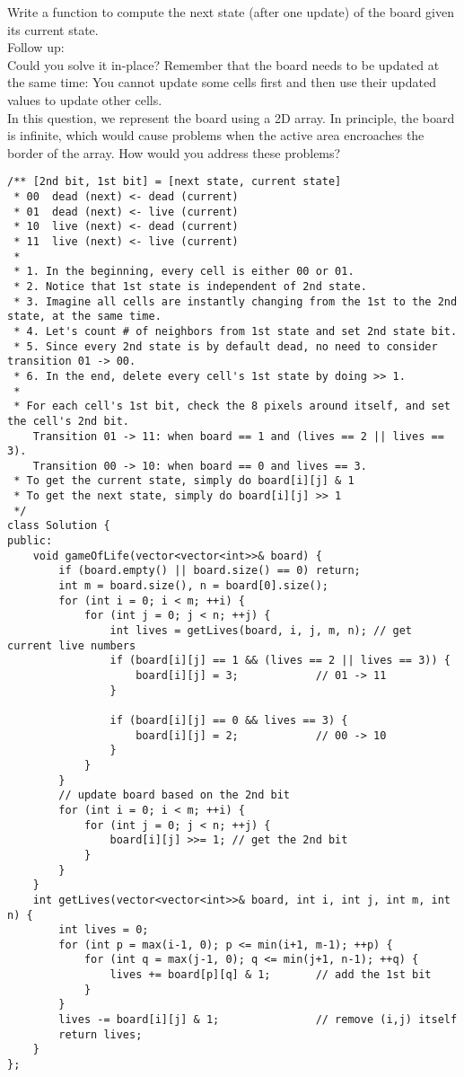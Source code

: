 Write a function to compute the next state (after one update) of the board given its current state.\\

Follow up:\\
    Could you solve it in-place? Remember that the board needs to be updated at the same time: You cannot update some cells first and then use their updated values to update other cells.\\
    In this question, we represent the board using a 2D array. In principle, the board is infinite, which would cause problems when the active area encroaches the border of the array. How would you address these problems?\\
    
\begin{lstlisting}
/** [2nd bit, 1st bit] = [next state, current state]
 * 00  dead (next) <- dead (current)
 * 01  dead (next) <- live (current)  
 * 10  live (next) <- dead (current)  
 * 11  live (next) <- live (current) 
 * 
 * 1. In the beginning, every cell is either 00 or 01.
 * 2. Notice that 1st state is independent of 2nd state.
 * 3. Imagine all cells are instantly changing from the 1st to the 2nd state, at the same time.
 * 4. Let's count # of neighbors from 1st state and set 2nd state bit.
 * 5. Since every 2nd state is by default dead, no need to consider transition 01 -> 00.
 * 6. In the end, delete every cell's 1st state by doing >> 1.
 * 
 * For each cell's 1st bit, check the 8 pixels around itself, and set the cell's 2nd bit.
    Transition 01 -> 11: when board == 1 and (lives == 2 || lives == 3).
    Transition 00 -> 10: when board == 0 and lives == 3.
 * To get the current state, simply do board[i][j] & 1
 * To get the next state, simply do board[i][j] >> 1
 */
class Solution {
public:
    void gameOfLife(vector<vector<int>>& board) {
        if (board.empty() || board.size() == 0) return;
        int m = board.size(), n = board[0].size();
        for (int i = 0; i < m; ++i) {
            for (int j = 0; j < n; ++j) {
                int lives = getLives(board, i, j, m, n); // get current live numbers
                if (board[i][j] == 1 && (lives == 2 || lives == 3)) {
                    board[i][j] = 3;            // 01 -> 11
                }
                
                if (board[i][j] == 0 && lives == 3) {
                    board[i][j] = 2;            // 00 -> 10
                }
            }
        }
        // update board based on the 2nd bit
        for (int i = 0; i < m; ++i) {
            for (int j = 0; j < n; ++j) {
                board[i][j] >>= 1; // get the 2nd bit
            }
        }
    }
    int getLives(vector<vector<int>>& board, int i, int j, int m, int n) {
        int lives = 0;
        for (int p = max(i-1, 0); p <= min(i+1, m-1); ++p) {
            for (int q = max(j-1, 0); q <= min(j+1, n-1); ++q) {
                lives += board[p][q] & 1;       // add the 1st bit
            }
        }
        lives -= board[i][j] & 1;               // remove (i,j) itself
        return lives;
    }
};    
\end{lstlisting}
